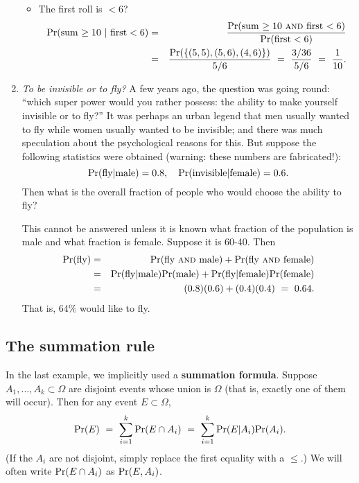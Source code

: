 \documentclass{report}
\theoremstyle{plain}
\theoremstyle{definition}
\newcommand{\pr}{\mbox{\rm Pr}}
\begin{document}
\begin{enumerate}
\begin{itemize}
\item The first roll is $< 6$?
\begin{eqnarray*}
\pr(\mbox{sum $\geq 10$} \ | \ \mbox{first} < 6) 
& = & 
\frac{\pr(\mbox{sum $\geq 10$ {\sc and} first $< 6$})}{\pr(\mbox{first} < 6)} \\
& = &
\frac{\pr(\{(5,5), (5,6), (4,6)\})}{5/6}
\ = \ 
\frac{3/36}{5/6} \ = \ \frac{1}{10} .
\end{eqnarray*}

\end{itemize}

\item {\it To be invisible or to fly?} A few years ago, the question was going round: ``which super power would you rather possess: the ability to make yourself invisible or to fly?'' It was perhaps an urban legend that men usually wanted to fly while women usually wanted to be invisible; and there was much speculation about the psychological reasons for this. But suppose the following statistics were obtained (warning: these numbers are fabricated!):
$$ \pr(\mbox{fly} | \mbox{male}) = 0.8, \ \ \ \pr(\mbox{invisible} | \mbox{female}) = 0.6 .$$
Then what is the overall fraction of people who would choose the ability to fly?

This cannot be answered unless it is known what fraction of the population is male and what fraction is female. Suppose it is 60-40. Then
\begin{eqnarray*}
\pr(\mbox{fly}) 
& = & \pr(\mbox{fly {\sc and} male}) + \pr(\mbox{fly {\sc and} female}) \\
& = & \pr(\mbox{fly}| \mbox{male}) \pr(\mbox{male}) + \pr(\mbox{fly}| \mbox{female}) \pr(\mbox{female}) \\
& = & (0.8)(0.6) + (0.4)(0.4) \ = \ 0.64.
\end{eqnarray*}
That is, $64\%$ would like to fly.
\end{enumerate}

\subsection{The summation rule}

In the last example, we implicitly used a {\bf summation formula}. Suppose $A_1, \ldots, A_k \subset \Omega$ are disjoint events whose union is $\Omega$ (that is, exactly one of them will occur). Then for any event $E \subset \Omega$,
$$ \pr(E) 
\ = \ 
\sum_{i=1}^k \pr(E \cap A_i) 
\ = \ 
\sum_{i=1}^k \pr(E | A_i) \pr(A_i).
$$
(If the $A_i$ are not disjoint, simply replace the first equality with a $\leq$.) We will often write $\pr(E \cap A_i)$ as $\pr(E,A_i)$.
\end{document}
